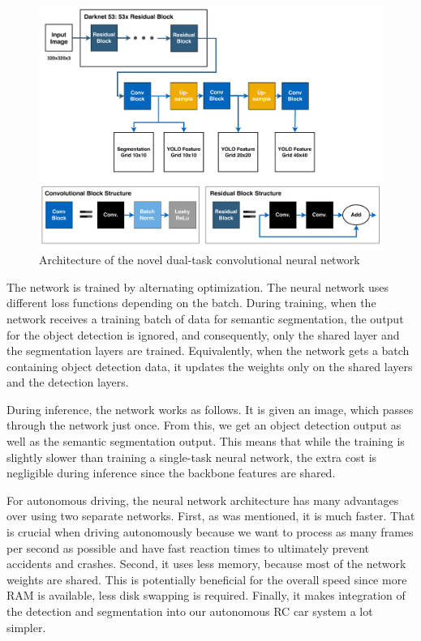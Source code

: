 \documentclass{ctuthesis/ctuthesis}
\begin{document}
\begin{figure}[]
    \centering
    \includegraphics[width=1\textwidth]{images/network_architecture.pdf}
    
    \caption{Architecture of the novel dual-task convolutional neural network}\label{f:dual_task}
\end{figure}



The network is trained by alternating optimization. The neural network uses different loss functions depending on the batch. During training, when the network receives a training batch of data for semantic segmentation, the output for the object detection is ignored, and consequently, only the shared layer and the segmentation layers are trained. Equivalently, when the network gets a batch containing object detection data, it updates the weights only on the shared layers and the detection layers. \par


During inference, the network works as follows. It is given an image, which passes through the network just once. From this, we get an object detection output as well as the semantic segmentation output. This means that while the training is slightly slower than training a single-task neural network, the extra cost is negligible during inference since the backbone features are shared. \par


For autonomous driving, the neural network architecture has many advantages over using two separate networks. First, as was mentioned, it is much faster. That is crucial when driving autonomously because we want to process as many frames per second as possible and have fast reaction times to ultimately prevent accidents and crashes. Second, it uses less memory, because most of the network weights are shared. This is potentially beneficial for the overall speed since more RAM is available, less disk swapping is required. Finally, it makes integration of the detection and segmentation into our autonomous RC car system a lot simpler.
\end{document}
